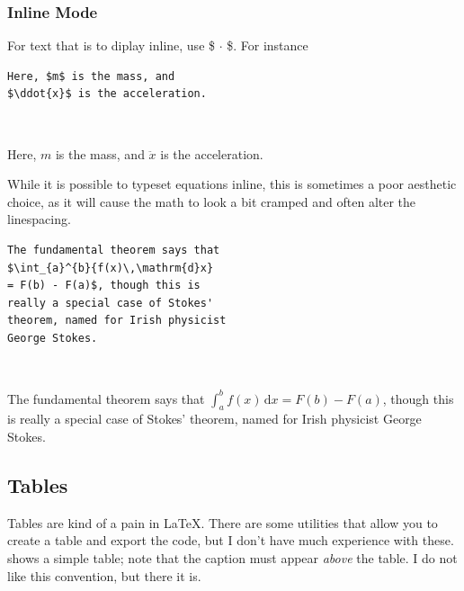 \subsubsection{Inline Mode}
For text that is to diplay inline, use \$$\,\cdot\,$\$.
For instance
\begin{center}
\begin{minipage}{0.45\textwidth}
\vspace{2mm}
\small
\begin{verbatim}
Here, $m$ is the mass, and 
$\ddot{x}$ is the acceleration.
\end{verbatim}
\end{minipage}~~~%
\begin{minipage}{0.45\textwidth}
\vspace{2mm}
\small
Here, $m$ is the mass, and $\ddot{x}$ is the acceleration.
\end{minipage}
\end{center}
While it is possible to typeset equations inline, this is sometimes a poor aesthetic choice, as it will cause the math to look a bit cramped and often alter the linespacing.
\begin{center}
\begin{minipage}{0.45\textwidth}
\vspace{1mm}
\scriptsize
\begin{verbatim}
The fundamental theorem says that
$\int_{a}^{b}{f(x)\,\mathrm{d}x}
= F(b) - F(a)$, though this is
really a special case of Stokes'
theorem, named for Irish physicist
George Stokes.
\end{verbatim}
\end{minipage}~~~%
\begin{minipage}{0.45\textwidth}
\vspace{1mm}
\small
The fundamental theorem says that
$\int_{a}^{b}{f(x)\,\mathrm{d}x}
= F(b) - F(a)$, though this is
really a special case of Stokes'
theorem, named for Irish physicist
George Stokes.
\end{minipage}
\end{center}

\subsection{Tables}
Tables are kind of a pain in \LaTeX.
There are some utilities that allow you to create a table and export the code, but I don't have much experience with these.
 shows a simple table; 
note that the caption must appear \emph{above} the table.
I do not like this convention, but there it is.

